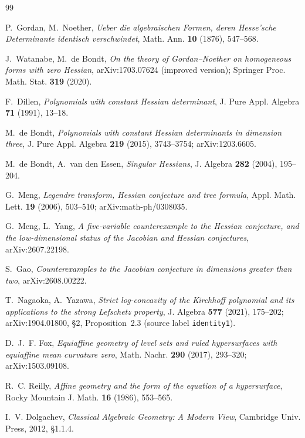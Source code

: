 \documentclass[11pt]{article}
\theoremstyle{plain}
\theoremstyle{definition}
\begin{document}
\begin{thebibliography}{99}

 P.~Gordan, M.~Noether, \emph{Ueber die algebraischen
Formen, deren Hesse'sche Determinante identisch verschwindet}, Math.
Ann. \textbf{10} (1876), 547--568.

 J.~Watanabe, M.~de Bondt, \emph{On the theory of
Gordan--Noether on homogeneous forms with zero Hessian},
arXiv:1703.07624 (improved version); Springer Proc. Math. Stat.
\textbf{319} (2020).

 F.~Dillen, \emph{Polynomials with constant Hessian
determinant}, J. Pure Appl. Algebra \textbf{71} (1991), 13--18.

 M.~de Bondt, \emph{Polynomials with constant
Hessian determinants in dimension three}, J. Pure Appl. Algebra
\textbf{219} (2015), 3743--3754; arXiv:1203.6605.

 M.~de Bondt, A.~van den Essen, \emph{Singular
Hessians}, J. Algebra \textbf{282} (2004), 195--204.

 G.~Meng, \emph{Legendre transform, Hessian
conjecture and tree formula}, Appl. Math. Lett. \textbf{19} (2006),
503--510; arXiv:math-ph/0308035.

 G.~Meng, L.~Yang, \emph{A five-variable
counterexample to the Hessian conjecture, and the low-dimensional
status of the Jacobian and Hessian conjectures}, arXiv:2607.22198.

 S.~Gao, \emph{Counterexamples to the Jacobian conjecture
in dimensions greater than two}, arXiv:2608.00222.

 T.~Nagaoka, A.~Yazawa, \emph{Strict log-concavity of the
Kirchhoff polynomial and its applications to the strong Lefschetz
property}, J. Algebra \textbf{577} (2021), 175--202; arXiv:1904.01800,
\S2, Proposition~2.3 (source label \texttt{identity1}).

 D.~J.~F. Fox, \emph{Equiaffine geometry of level sets
and ruled hypersurfaces with equiaffine mean curvature zero}, Math.
Nachr. \textbf{290} (2017), 293--320; arXiv:1503.09108.

 R.~C. Reilly, \emph{Affine geometry and the form of
the equation of a hypersurface}, Rocky Mountain J. Math. \textbf{16}
(1986), 553--565.

 I.~V. Dolgachev, \emph{Classical Algebraic
Geometry: A Modern View}, Cambridge Univ. Press, 2012, \S1.1.4.


\end{thebibliography}
\end{document}
